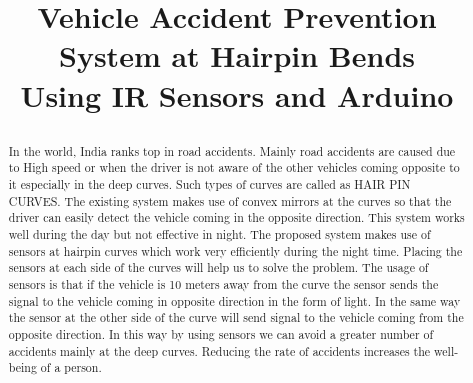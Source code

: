 \documentclass[conference]{IEEEtran}
\begin{document}
    \title{Vehicle Accident Prevention System at Hairpin Bends\\{
    \large Using IR Sensors and Arduino
    }

        }

    \author{
    \and
    \and
    \and
    \and

    }

    \maketitle

    \begin{abstract}
        In the world, India ranks top in road accidents. Mainly road accidents are caused due to High speed
        or when the driver is not aware of the other vehicles coming opposite to it especially in the deep curves.
        Such types of curves are called as HAIR PIN CURVES. The existing system makes use of convex mirrors
        at the curves so that the driver can easily detect the vehicle coming in the opposite direction. This system
        works well during the day but not effective in night. The proposed system makes use of sensors at hairpin
        curves which work very efficiently during the night time. Placing the sensors at each side of the curves will
        help us to solve the problem. The usage of sensors is that if the vehicle is 10 meters away from the curve the
        sensor sends the signal to the vehicle coming in opposite direction in the form of light. In the same way the
        sensor at the other side of the curve will send signal to the vehicle coming from the opposite direction. In
        this way by using sensors we can avoid a greater number of accidents mainly at the deep curves. Reducing
        the rate of accidents increases the well-being of a person.
    \end{abstract}
\end{document}
